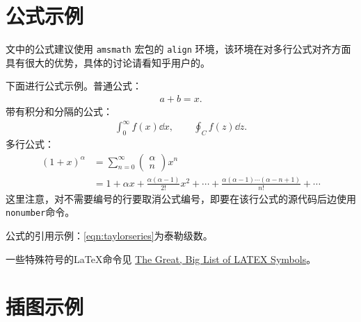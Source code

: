 \section{公式示例} 

文中的公式建议使用 \texttt{amsmath} 宏包的 \texttt{align} 环境，该环境在对多行公式对齐方面具有很大的优势，具体的讨论请看知乎用户\href{https://www.zhihu.com/people/bo-xue-duo-wen-63}{}的\href{https://www.zhihu.com/question/477805692/answer/2045084752}{}。

下面进行公式示例。普通公式：
\begin{align}
    a+b=x.
\end{align}
带有积分和分隔的公式：
\begin{align}
   \int^{\infty}_{0} f(x)\dd{x}, \qquad \oint_{C} f(z)\dd {z}.
\end{align}
多行公式：
\begin{align}
    \left(1+x\right)^{\alpha} &= \sum^{\infty}_{n=0}\left(\begin{matrix} \alpha \\ n\end{matrix}\right)x^n \nonumber \\ 
    &= 1 + \alpha x + \frac{\alpha(\alpha-1)}{2!}x^2 + \cdots + \frac{\alpha(\alpha-1)\cdots(\alpha-n+1)}{n!} + \cdots
    \label{eqn:taylorseries}
\end{align}
这里注意，对不需要编号的行要取消公式编号，即要在该行公式的源代码后边使用\texttt{ nonumber}命令。

公式的引用示例：\autoref{eqn:taylorseries}为泰勒级数。

一些特殊符号的\LaTeX{}命令见 \href{https://mirrors.ustc.edu.cn/CTAN/info/symbols/comprehensive/symbols-a4.pdf}{The Great, Big List of LATEX Symbols}。

\section{插图示例}

